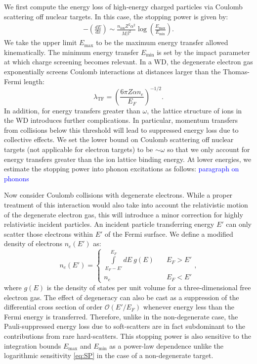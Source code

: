 \documentclass[twocolumn,showpacs,preprintnumbers,amsmath,amssymb,prd]{revtex4}
\def\r{\right)}
\def\l{\left(}
\begin{document}
\begin{appendices}
We first compute the energy loss of high-energy charged particles via Coulomb scattering off nuclear targets. 
In this case, the stopping power is given by:
\begin{align}
\label{eq:SP}
-  \l \frac{dE}{dx}\r \sim \frac{n_\text{ion} Z^2 \alpha^2}{M \beta^2} \log {\l\frac{E_{\text{max}}}{E_{\text{min}}}\r}.
\end{align}
We take the upper limit $E_\text{max}$ to be the maximum energy transfer allowed kinematically. 
The minimum energy transfer $E_\text{min}$ is set by the impact parameter at which charge screening becomes relevant. 
In a WD, the degenerate electron gas exponentially screens Coulomb interactions at distances larger than the Thomas-Fermi length:
\begin{equation}
\label{eq:TF}
\lambda_{\text{TF}} = \l \frac{6 \pi Z \alpha n_e}{E_F}\r^{-1/2}.
\end{equation}
In addition, for energy transfers greater than $\omega$, the lattice structure of ions in the WD introduces further complications.
In particular, momentum transfers from collisions below this threshold will lead to suppressed energy loss due to collective effects.
We set the lower bound on Coulomb scattering off nuclear targets (not applicable for electron targets) to be $\sim \omega$ so that we only account for energy transfers greater than the ion lattice binding energy.
At lower energies, we estimate the stopping power into phonon excitations as follows: \textcolor{blue}{paragraph on phonons}

Now consider Coulomb collisions with degenerate electrons.
While a proper treatment of this interaction would also take into account the relativistic motion of the degenerate electron gas, this will introduce a minor correction for highly relativistic incident particles. 
An incident particle transferring energy $E'$ can only scatter those electrons within $E'$ of the Fermi surface.
We define a modified density of electrons $n_e(E')$ as:
\begin{equation}
\label{eq:pauliblocking}
n_e(E') = \left\{
        \begin{array}{ll}
            \displaystyle \int \limits_{E_F -E'}^{E_F}dE ~g(E) & \quad E_F > E' \\
            n_e & \quad E_F < E'
        \end{array}
    \right.,
\end{equation}
where $g(E)$ is the density of states per unit volume for a three-dimensional free electron gas.
The effect of degeneracy can also be cast as a suppression of the differential cross section of order $\mathcal{O}(E'/E_F)$ whenever energy less than the Fermi energy is transferred.
Therefore, unlike in the non-degenerate case, the Pauli-suppressed energy loss due to soft-scatters are in fact subdominant to the contributions from rare hard-scatters.
This stopping power is also sensitive to the integration bounds $E_{\text{max}}$ and $E_{\text{min}}$ as a power-law dependence unlike the logarithmic sensitivity \eqref{eq:SP} in the case of a non-degenerate target.


\end{appendices}
\end{document}
